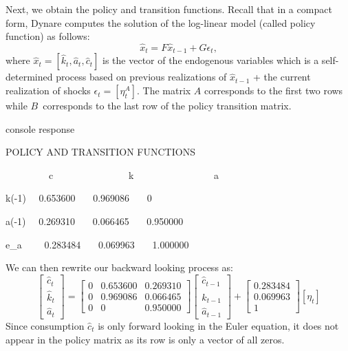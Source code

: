\documentclass[a4paper,12pt]{article}%
\begin{document}
Next, we obtain the policy and transition functions. Recall that in a compact
form, Dynare computes the solution of the log-linear model (called policy
function) as follows:%
\begin{equation}
\hat{x}_{t}=F\hat{x}_{t-1}+G\epsilon_{t},
\end{equation}
where $\hat{x}_{t}=[\hat{k}_{t},\hat{a}_{t},\hat{c}_{t}]$ is the vector of the
endogenous variables which is a self-determined process based on previous
realizations of $\hat{x}_{t-1}$ + the current realization of shocks
$\epsilon_{t}=[\eta_{t}^{A}]$. The matrix $A$ corresponds to the first two
rows while $B$\ corresponds to the last row of the policy transition matrix.%

\vspace{3ex}
\begin{myresult}{console response}%


\textsf{POLICY AND TRANSITION FUNCTIONS}

\textsf{%
\vspace{3ex}%
}

\textsf{\ \ \ \ \ \ \ \ \ c \ \ \ \ \ \ \ \ \ \ \ \ \ \ \ k
\ \ \ \ \ \ \ \ \ \ \ \ \ \ \ \ a}

\textsf{k(-1) \ \ 0.653600 \ \ \ 0.969086 \ \ \ 0}

\textsf{a(-1) \ \ 0.269310 \ \ \ 0.066465 \ \ \ 0.950000}

\textsf{e\_a \ \ \ \ 0.283484 \ \ \ 0.069963 \ \ \ 1.000000}%

\end{myresult}
\vspace{3ex}%


We can then rewrite our backward looking process as:%
\[%
\begin{bmatrix}
\hat{c}_{t}\\
\hat{k}_{t}\\
\hat{a}_{t}%
\end{bmatrix}
=%
\begin{bmatrix}
0 & 0.653600 & 0.269310\\
0 & 0.969086 & 0.066465\\
0 & 0 & 0.950000
\end{bmatrix}%
\begin{bmatrix}
\hat{c}_{t-1}\\
\hat{k}_{t-1}\\
\hat{a}_{t-1}%
\end{bmatrix}
+%
\begin{bmatrix}
0.283484\\
0.069963\\
1
\end{bmatrix}
[\eta_{t}]
\]
Since consumption $\hat{c}_{t}$ is only forward looking in the Euler equation,
it does not appear in the policy matrix as its row is only a vector of all zeros.
\end{document}
